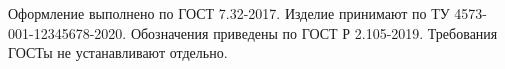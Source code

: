 Оформление выполнено по ГОСТ 7.32-2017.
Изделие принимают по ТУ 4573-001-12345678-2020.
Обозначения приведены по ГОСТ Р 2.105-2019.
Требования ГОСТы не устанавливают отдельно.
